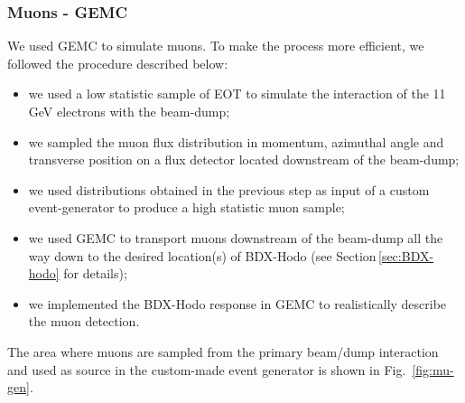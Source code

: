 \subsubsection{Muons - GEMC}\label{sec:gmc-mu}
We used GEMC to simulate muons. To make the  process more efficient, we followed the   procedure described below: 
\begin{itemize}
\item  we used a low statistic sample of EOT to simulate the interaction of the 11 GeV electrons with the beam-dump;
\item  we sampled the muon flux distribution in momentum, azimuthal angle and transverse position  on a flux detector located downstream of the beam-dump;
\item we used  distributions obtained  in the  previous step as input of a custom event-generator to produce a high statistic muon sample;
\item we used GEMC to transport muons  downstream of the beam-dump all the way down to the desired location(s) of  BDX-Hodo (see Section\,\ref{sec:BDX-hodo} for details);
\item  we implemented  the  BDX-Hodo response in GEMC to realistically describe the muon detection.
\end{itemize}
The area where  muons are sampled from the primary beam/dump interaction and used  as source in the custom-made event generator is shown in Fig.~\ref{fig:mu-gen}.



